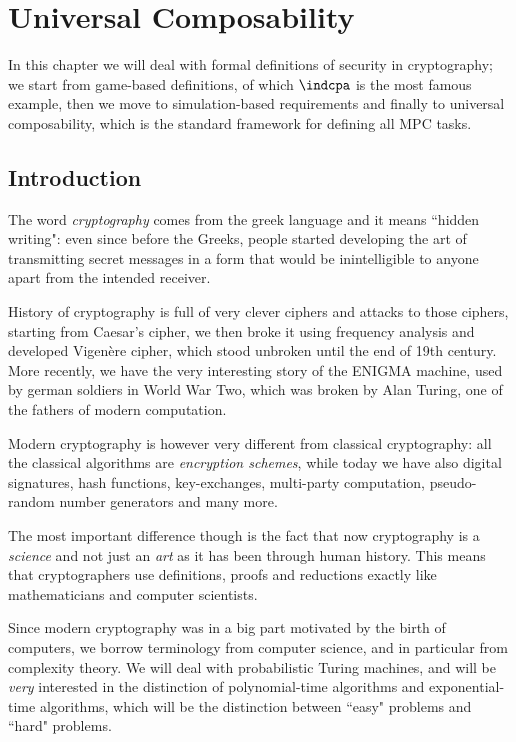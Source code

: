 \chapter{Universal Composability}

In this chapter we will deal with formal definitions of security in cryptography; we start from game-based definitions, of which $\indcpa$ is the most famous example, then we move to simulation-based requirements and finally to universal composability, which is the standard framework for defining all MPC tasks.

\section{Introduction}
The word \emph{cryptography} comes from the greek language and it means ``hidden writing": even since before the Greeks, people started developing the art of transmitting secret messages in a form that would be inintelligible to anyone apart from the intended receiver.

History of cryptography is full of very clever ciphers and attacks to those ciphers, starting from Caesar's cipher, we then broke it using frequency analysis and developed Vigenère cipher, which stood unbroken until the end of 19th century. More recently, we have the very interesting story of the ENIGMA machine, used by german soldiers in World War Two, which was broken by Alan Turing, one of the fathers of modern computation.

Modern cryptography is however very different from classical cryptography: all the classical algorithms are \emph{encryption schemes}, while today we have also digital signatures, hash functions, key-exchanges, multi-party computation, pseudo-random number generators and many more.

The most important difference though is the fact that now cryptography is a \emph{science} and not just an \emph{art} as it has been through human history. This means that cryptographers use definitions, proofs and reductions exactly like mathematicians and computer scientists.

Since modern cryptography was in a big part motivated by the birth of computers, we borrow terminology from computer science, and in particular from complexity theory. We will deal with probabilistic Turing machines, and will be \emph{very} interested in the distinction of polynomial-time algorithms and exponential-time algorithms, which will be the distinction between ``easy" problems and ``hard" problems.

